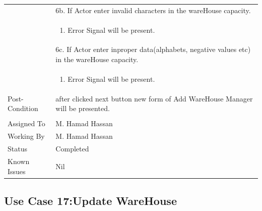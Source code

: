 \documentclass[12pt,a4paper]{article}
\begin{document}
\begin{longtable}{| p{3cm}|p{12cm}|}
& 6b. If Actor enter invalid characters in the wareHouse capacity. \\
& \begin{enumerate}
		\item Error Signal will be present.
	\end{enumerate}
\\ 
& 6c. If Actor enter inproper data(alphabets, negative values etc) in the wareHouse capacity. \\
& \begin{enumerate}
		\item Error Signal will be present.
	\end{enumerate}


\\ \hline 


Post-Condition &  after clicked next button new form of Add WareHouse Manager will be presented.  \\ \hline
\\ \hline
Assigned To &  M. Hamad Hassan
\\ \hline
Working By &    M. Hamad Hassan
\\ \hline
Status & 	Completed	
\\ \hline
Known Issues & Nil
\\\hline

\end{longtable}

\subsection{Use Case 17:Update WareHouse}
\end{document}

